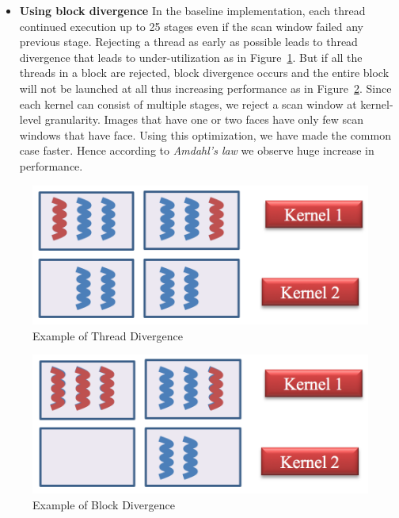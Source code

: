 \begin{itemize}
\vspace{0.1in}
\item \textbf{Using block divergence}
In the baseline implementation, each thread continued execution up to 25 stages 
even if the scan window failed any previous stage. Rejecting a thread as early as possible leads to thread 
divergence that leads to under-utilization as in Figure~\ref{fig:tdiv}. But if all the threads in a block 
are rejected, block divergence occurs and the entire block will not be launched at all thus increasing 
performance as in Figure~\ref{fig:bdiv}. Since each kernel can consist of multiple stages, we reject a 
scan window at kernel-level granularity. Images that have one or two faces have only few scan windows that 
have face. Using this optimization, we have made the common case faster. Hence according to 
\emph{Amdahl’s law} we observe huge increase in performance. 

\end{itemize}
\begin{figure}[h]
  \centering 
  \includegraphics[width=\linewidth]{figs/thread_div.png}
  \caption{Example of Thread Divergence \textnormal{\small }  }
  \label{fig:tdiv}
\end{figure}

\vspace{-0.1in}
\begin{figure}[h]
  \centering 
  \includegraphics[width=\linewidth]{figs/block_div.png}
  \caption{Example of Block Divergence \textnormal{\small }  }
  \label{fig:bdiv}
\end{figure}


